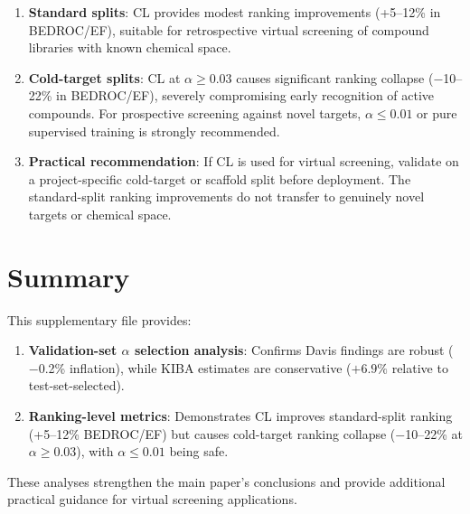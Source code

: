 \documentclass[10pt,a4paper]{article}
\begin{document}
\begin{enumerate}
\item \textbf{Standard splits}: CL provides modest ranking improvements (+5--12\% in BEDROC/EF), suitable for retrospective virtual screening of compound libraries with known chemical space.

\item \textbf{Cold-target splits}: CL at $\alpha \geq 0.03$ causes significant ranking collapse ($-$10--22\% in BEDROC/EF), severely compromising early recognition of active compounds. For prospective screening against novel targets, $\alpha \leq 0.01$ or pure supervised training is strongly recommended.

\item \textbf{Practical recommendation}: If CL is used for virtual screening, validate on a project-specific cold-target or scaffold split before deployment. The standard-split ranking improvements do not transfer to genuinely novel targets or chemical space.
\end{enumerate}

\section{Summary}

This supplementary file provides:
\begin{enumerate}
\item \textbf{Validation-set $\alpha$ selection analysis}: Confirms Davis findings are robust ($-$0.2\% inflation), while KIBA estimates are conservative ($+6.9\%$ relative to test-set-selected).
\item \textbf{Ranking-level metrics}: Demonstrates CL improves standard-split ranking (+5--12\% BEDROC/EF) but causes cold-target ranking collapse ($-$10--22\% at $\alpha \geq 0.03$), with $\alpha \leq 0.01$ being safe.
\end{enumerate}

These analyses strengthen the main paper's conclusions and provide additional practical guidance for virtual screening applications.
\end{document}
